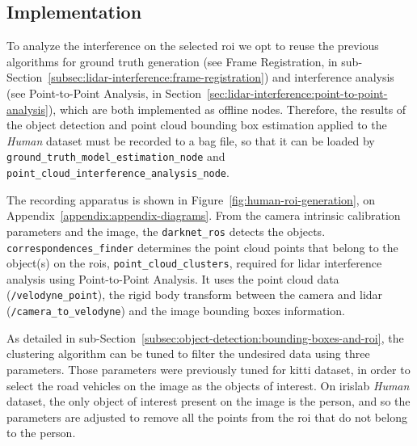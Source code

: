 \subsection{Implementation}
\label{subsec:lidar-interference:roi-implementation}
To analyze the interference on the selected \ac{roi} we opt to reuse the previous algorithms for ground truth generation (see Frame Registration, in sub-Section~\ref{subsec:lidar-interference:frame-registration}) and interference analysis (see Point-to-Point Analysis, in Section~\ref{sec:lidar-interference:point-to-point-analysis}), which are both implemented as offline nodes. Therefore, the results of the object detection and point cloud bounding box estimation applied to the \textit{Human} dataset must be recorded to a bag file, so that it can be loaded by \texttt{ground\_truth\_model\_estimation\_node} and \texttt{point\_cloud\_interference\_analysis\_node}.

The recording apparatus is shown in Figure~\ref{fig:human-roi-generation}, on Appendix~\ref{appendix:appendix-diagrams}. From the camera intrinsic calibration parameters and the image, the \texttt{darknet\_ros} detects the objects. \texttt{correspondences\_finder} determines the point cloud points that belong to the object(s) on the \acp{roi}, \texttt{point\_cloud\_clusters}, required for \ac{lidar} interference analysis using Point-to-Point Analysis. It uses the point cloud data (\texttt{/velodyne\_point}), the rigid body transform between the camera and \ac{lidar} (\texttt{/camera\_to\_velodyne}) and the image bounding boxes information.


%	

As detailed in sub-Section~\ref{subsec:object-detection:bounding-boxes-and-roi}, the clustering algorithm can be tuned to filter the undesired data using three parameters. Those parameters were previously tuned for \ac{kitti} dataset, in order to select the road vehicles on the image as the objects of interest. On \ac{irislab} \textit{Human} dataset, the only object of interest present on the image is the person, and so the parameters are adjusted to remove all the points from the \ac{roi} that do not belong to the person. 

